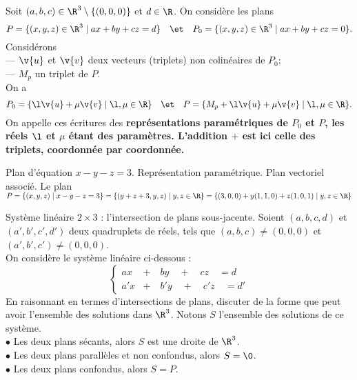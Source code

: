 \documentclass[11pt]{article}
\begin{document}
\begin{prop}{}{}
    Soit $(a,b,c)\in\R^3\setminus\{(0,0,0)\}$ et $d\in\R$. On considère les plans
    \begin{equation*}
        P=\{(x,y,z)\in\R^3\mid ax+by+cz=d\} \quad\et\quad P_0=\{(x,y,z)\in\R^3\mid ax+by+cz=0\}.
    \end{equation*}
    Considérons\\
    --- $\v{u}$ et $\v{v}$ deux vecteurs (triplets) non colinéaires de $P_0$;\\
    --- $M_p$ un triplet de $P$.\\
    On a
    \begin{equation*}
        P_0=\{\l\v{u}+\mu\v{v}\mid\l,\mu\in\R\}\quad\et\quad P=\{M_p+\l\v{u}+\mu\v{v}\mid\l,\mu\in\R\}.
    \end{equation*}
    On appelle ces écritures des \bf{représentations paramétriques} de $P_0$ et $P$, les réels $\l$ et $\mu$ étant des paramètres. L'addition $+$ est ici celle des triplets, coordonnée par coordonnée.
\end{prop}

\begin{ex}{}{}
    Plan d'équation $x-y-z=3$. Représentation paramétrique. Plan vectoriel associé.
    \tcblower
    Le plan $P=\{(x,y,z)\mid x-y-z=3\}=\{(y+z+3, y, z) \mid y,z\in\R\}=\{(3,0,0)+y(1,1,0)+z(1,0,1)\mid y,z\in\R\}$
\end{ex}

\begin{ex}{Système linéaire $2\times3$ : l'intersection de plans sous-jacente.}{}
    Soient $(a,b,c,d)$ et $(a',b',c',d')$ deux quadruplets de réels, tels que $(a,b,c)\neq(0,0,0)$ et $(a',b',c')\neq(0,0,0)$.\\
    On considère le système linéaire ci-dessous :
    \begin{equation*}
        \begin{cases}
            ax&+\quad by\quad+\quad cz\quad= d\\
            a'x&+\quad b'y\quad+\quad c'z\quad=d'
        \end{cases}
    \end{equation*}
    En raisonnant en termes d'intersections de plans, discuter de la forme que peut avoir l'ensemble des solutions dans $\R^3$.
    \tcblower
    Notons $S$ l'ensemble des solutions de ce système.\\
    $\bullet$ Les deux plans sécants, alors $S$ est une droite de $\R^3$.\\
    $\bullet$ Les deux plans parallèles et non confondus, alors $S=\0$.\\
    $\bullet$ Les deux plans confondus, alors $S=P$.
\end{ex}
\end{document}
